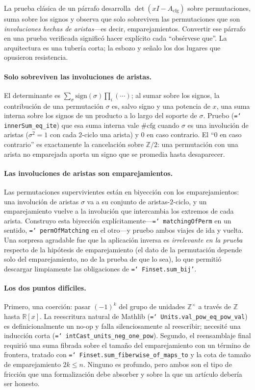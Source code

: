 \documentclass[11pt]{article}
\newcommand{\lean}[1]{\texttt{\hyphenchar\font=`\- #1}}
\newcommand{\Z}{\mathbb{Z}}
\newcommand{\R}{\mathbb{R}}
\begin{document}
La prueba clásica de un párrafo desarrolla $\det(xI-A_{\mathrm{cfg}})$ sobre
permutaciones, suma sobre los signos y observa que solo sobreviven las
permutaciones que son \emph{involuciones hechas de aristas}---es decir,
emparejamientos. Convertir ese párrafo en una prueba verificada significó hacer
explícito cada ``obsérvese que''. La arquitectura es una tubería corta; la
esbozo y señalo los dos lugares que opusieron resistencia.

\paragraph{Solo sobreviven las involuciones de aristas.}
El determinante es $\sum_{\sigma}\mathrm{sign}(\sigma)\prod_i(\cdots)$; al sumar
sobre los signos, la contribución de una permutación $\sigma$ es, salvo
signo y una potencia de $x$, una suma interna sobre los signos de un producto a lo
largo del soporte de $\sigma$. Pruebo (\lean{innerSum\_eq\_ite}) que esa suma
interna vale $\#\mathrm{cfg}$ cuando $\sigma$ es una involución de aristas
($\sigma^2=1$ con cada $2$-ciclo una arista) y $0$ en caso contrario. El
``$0$ en caso contrario'' es exactamente la cancelación sobre $\Z/2$: una
permutación con una arista no emparejada aporta un signo que se promedia hasta
desaparecer.

\paragraph{Las involuciones de aristas son emparejamientos.}
Las permutaciones supervivientes están en biyección con los emparejamientos: una
involución de aristas $\sigma$ va a su conjunto de aristas-$2$-ciclo, y un
emparejamiento vuelve a la involución que intercambia los extremos de cada arista.
Construyo esta biyección explícitamente---\lean{matchingOfPerm} en un sentido,
\lean{permOfMatching} en el otro---y pruebo ambos viajes de ida y vuelta. Una
sorpresa agradable fue que la aplicación inversa es \emph{irrelevante en la
prueba} respecto de la hipótesis de emparejamiento (el dato de la permutación
depende solo del emparejamiento, no de la prueba de que lo sea), lo que permitió
descargar limpiamente las obligaciones de \lean{Finset.sum\_bij'}.

\paragraph{Los dos puntos difíciles.}
Primero, una coerción: pasar $(-1)^k$ del grupo de unidades $\Z^\times$ a través
de $\Z$ hasta $\R[x]$. La reescritura natural de Mathlib
(\lean{Units.val\_pow\_eq\_pow\_val}) es definicionalmente un no-op y falla
silenciosamente al reescribir; necesité una inducción corta
(\lean{intCast\_units\_neg\_one\_pow}). Segundo, el reensamblaje final requirió
una suma fibrada sobre el tamaño del emparejamiento con un término de frontera,
tratado con \lean{Finset.sum\_fiberwise\_of\_maps\_to} y la cota de tamaño de
emparejamiento $2k\le n$. Ninguno es profundo, pero ambos son el tipo de fricción
que una formalización debe absorber y sobre la que un artículo debería ser
honesto.
\end{document}
